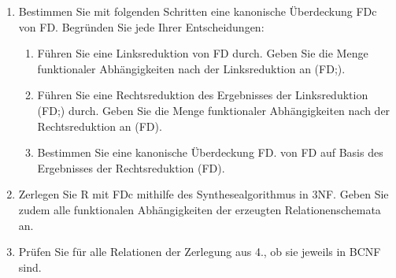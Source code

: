 \documentclass{bschlangaul-aufgabe}
\begin{document}
\begin{enumerate}

\item Bestimmen Sie mit folgenden Schritten eine kanonische Überdeckung
FDc von FD. Begründen Sie jede Ihrer Entscheidungen:

\begin{enumerate}


\item Führen Sie eine Linksreduktion von FD durch. Geben Sie die Menge
funktionaler Abhängigkeiten nach der Linksreduktion an (FD;).

\begin{bAntwort}
\end{bAntwort}


\item Führen Sie eine Rechtsreduktion des Ergebnisses der Linksreduktion
(FD;) durch. Geben Sie die Menge funktionaler Abhängigkeiten nach der
Rechtsreduktion an (FD).

\begin{bAntwort}
\end{bAntwort}


\item Bestimmen Sie eine kanonische Überdeckung FD. von FD auf Basis des
Ergebnisses der Rechtsreduktion (FD).

\begin{bAntwort}
\end{bAntwort}

\end{enumerate}

\item Zerlegen Sie R mit FDc mithilfe des Synthesealgorithmus in 3NF.
Geben Sie zudem alle funktionalen Abhängigkeiten der erzeugten
Relationenschemata an.


\item Prüfen Sie für alle Relationen der Zerlegung aus 4., ob sie
jeweils in BCNF sind.

\end{enumerate}
\end{document}

